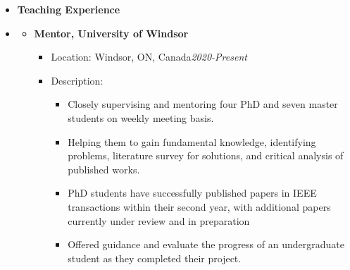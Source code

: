 
\begin {itemize} \item [] {\bf \Large   Teaching Experience }  \vspace{-1.5em}
\item []  {\bf \hrulefill } \mdseries \normalsize 
    \begin {itemize}

     \item [$\bullet$] \bf {\mtf \normalsize Mentor, University of Windsor} \mdseries
            \begin {itemize}
                \item [-]  {  Location:  Windsor, ON, Canada\small \hspace{5.8cm}\textit{2020-Present}\normalsize} 
                \item [-]   {   Description:} 
                    \begin {itemize}
                        \item [\textbullet] Closely supervising and mentoring four PhD and seven master students on weekly meeting basis.
                        \item [\textbullet] Helping them to gain fundamental knowledge, identifying problems, literature survey for solutions, and critical analysis of published works.
                        \item [\textbullet] PhD students have successfully published papers in IEEE transactions within their second year, with additional papers currently under review and in preparation
                        \item [\textbullet] Offered guidance and evaluate the progress of an undergraduate student as they completed their project.
                    \end {itemize}
            \end {itemize} \vspace{0.3cm}
            

\end{itemize}
\end{itemize}
